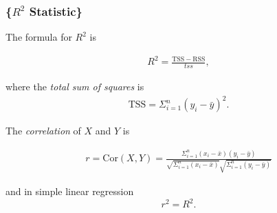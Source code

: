 \documentclass[]{article}
\newcommand{\rss}{\mathrm{RSS}}
\newcommand{\tss}{\mathrm{TSS}}
\newcommand{\cor}{\mathrm{Cor}}
\begin{document}
\subsubsection{\texorpdfstring{\{\(R^2\)
Statistic\}}{\{R\^{}2 Statistic\}}}\label{r2-statistic}

The formula for \(R^2\) is

\begin{align}
    R^2 = \frac{\tss - \rss}{tss},
\end{align}

where the \emph{total sum of squares} is \[
\begin{align*}
    \tss =\Sigma_{i=1}^n\left(y_i - \bar{y}\right)^2. 
\end{align*}
\]

The \emph{correlation} of \(X\) and \(Y\) is

\begin{align}
r = \cor(X, Y) = \frac{\Sigma_{i = 1}^n\left(x_i - \bar{x}\right)\left(y_i - \bar{y}\right)}
        {\sqrt{\Sigma_{i = 1}^n\left(x_i - \bar{x}\right)}
                    \sqrt{\Sigma_{i = 1}^n\left(y_i - \bar{y}\right)}}
\end{align}

and in simple linear regression \[r^2 = R^2.\]
\end{document}
